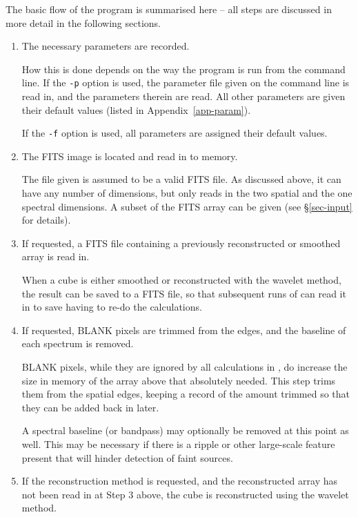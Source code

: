 The basic flow of the program is summarised here -- all steps are
discussed in more detail in the following sections.
\begin{enumerate}
\item The necessary parameters are recorded.

  How this is done depends on the way the program is run from the
  command line. If the \texttt{-p} option is used, the parameter file
  given on the command line is read in, and the parameters therein are
  read. All other parameters are given their default values (listed in
  Appendix~\ref{app-param}).

  If the \texttt{-f} option is used, all parameters are assigned their
  default values.

\item The FITS image is located and read in to memory.

  The file given is assumed to be a valid FITS file. As discussed
  above, it can have any number of dimensions, but \duchamp only
  reads in the two spatial and the one spectral dimensions. A subset
  of the FITS array can be given (see \S\ref{sec-input} for details).

\item \label{step-reuse} If requested, a FITS file containing a
  previously reconstructed or smoothed array is read in.

  When a cube is either smoothed or reconstructed with the \atrous
  wavelet method, the result can be saved to a FITS file, so that
  subsequent runs of \duchamp can read it in to save having to re-do
  the calculations.

\item \label{step-blank} If requested, BLANK pixels are trimmed from
  the edges, and the baseline of each spectrum is removed.

  BLANK pixels, while they are ignored by all calculations in
  \duchamp, do increase the size in memory of the array above that
  absolutely needed. This step trims them from the spatial edges,
  keeping a record of the amount trimmed so that they can be added
  back in later.

  A spectral baseline (or bandpass) may optionally be removed at this
  point as well. This may be necessary if there is a ripple or other
  large-scale feature present that will hinder detection of faint
  sources.

\item If the reconstruction method is requested, and the reconstructed
  array has not been read in at Step 3 above, the cube is
  reconstructed using the \atrous wavelet method.


\end{enumerate}
